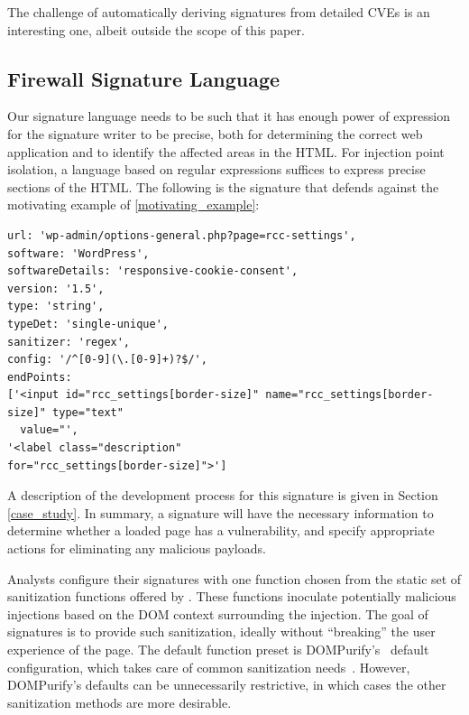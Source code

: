 The challenge of automatically deriving signatures from detailed CVEs is an interesting
one, albeit outside the scope of this paper.


 \subsection{Firewall Signature Language} \label{signature_language}

 Our signature language needs to be such that it has enough power of
 expression for the signature writer to be precise, both for
 determining the correct web application and to identify the affected
 areas in the HTML. For injection point isolation, a language based on
 regular expressions suffices to express precise
 sections of the HTML. The following is the signature that defends
 against the motivating example of \autoref{motivating_example}:

 \begin{lstlisting}[breaklines=true,caption={An \sys signature},label={lst:xsnare_signature}]
url: 'wp-admin/options-general.php?page=rcc-settings',
software: 'WordPress',
softwareDetails: 'responsive-cookie-consent',
version: '1.5',
type: 'string',
typeDet: 'single-unique',
sanitizer: 'regex',
config: '/^[0-9](\.[0-9]+)?$/',
endPoints: 
['<input id="rcc_settings[border-size]" name="rcc_settings[border-size]" type="text"
  value="',
'<label class="description" 
for="rcc_settings[border-size]">']
\end{lstlisting}

A description of the development process for this signature is given
in Section \ref{case_study}. In summary, a signature will have the
necessary information to determine whether a loaded page has a
vulnerability, and specify appropriate actions for eliminating
any malicious payloads.

Analysts configure their signatures with one
function chosen from the static set of sanitization
functions offered by \sys. These functions inoculate potentially malicious injections
based on the DOM context surrounding the injection. The goal of
signatures is to provide such sanitization, ideally without ``breaking''
the user experience of the page. The default function preset is DOMPurify's~\cite{10.1007/978-3-319-66399-9_7} default
configuration,
which takes care of common sanitization needs~\cite{safecontent}. However, DOMPurify's defaults can be unnecessarily restrictive, in which cases the other sanitization methods are more desirable.

